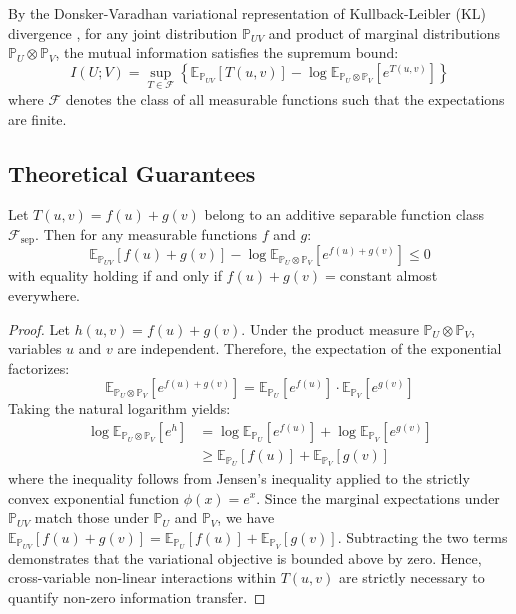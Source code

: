By the Donsker-Varadhan variational representation of Kullback-Leibler (KL) divergence \cite{donsker1975asymptotic, belghazi2018mine}, for any joint distribution $\mathbb{P}_{UV}$ and product of marginal distributions $\mathbb{P}_U \otimes \mathbb{P}_V$, the mutual information satisfies the supremum bound:
\begin{equation}
\label{eq:dv_supremum}
I(U; V) = \sup_{T \in \mathcal{F}} \left\{ \mathbb{E}_{\mathbb{P}_{UV}}[T(u, v)] - \log \mathbb{E}_{\mathbb{P}_U \otimes \mathbb{P}_V}[e^{T(u, v)}] \right\}
\end{equation}
where $\mathcal{F}$ denotes the class of all measurable functions such that the expectations are finite.

\subsection{Theoretical Guarantees}

\begin{proposition}
\label{prop:non_separable}
Let $T(u, v) = f(u) + g(v)$ belong to an additive separable function class $\mathcal{F}_{\text{sep}}$. Then for any measurable functions $f$ and $g$:
\begin{equation}
\mathbb{E}_{\mathbb{P}_{UV}}[f(u) + g(v)] - \log \mathbb{E}_{\mathbb{P}_U \otimes \mathbb{P}_V}[e^{f(u) + g(v)}] \le 0
\end{equation}
with equality holding if and only if $f(u) + g(v) = \text{constant}$ almost everywhere.
\end{proposition}
\begin{proof}
Let $h(u, v) = f(u) + g(v)$. Under the product measure $\mathbb{P}_U \otimes \mathbb{P}_V$, variables $u$ and $v$ are independent. Therefore, the expectation of the exponential factorizes:
\begin{equation}
\mathbb{E}_{\mathbb{P}_U \otimes \mathbb{P}_V}[e^{f(u)+g(v)}] = \mathbb{E}_{\mathbb{P}_U}[e^{f(u)}] \cdot \mathbb{E}_{\mathbb{P}_V}[e^{g(v)}]
\end{equation}
Taking the natural logarithm yields:
\begin{align}
\log \mathbb{E}_{\mathbb{P}_U \otimes \mathbb{P}_V}[e^{h}] &= \log \mathbb{E}_{\mathbb{P}_U}[e^{f(u)}] + \log \mathbb{E}_{\mathbb{P}_V}[e^{g(v)}] \nonumber \\
&\ge \mathbb{E}_{\mathbb{P}_U}[f(u)] + \mathbb{E}_{\mathbb{P}_V}[g(v)]
\end{align}
where the inequality follows from Jensen's inequality applied to the strictly convex exponential function $\phi(x) = e^x$. Since the marginal expectations under $\mathbb{P}_{UV}$ match those under $\mathbb{P}_U$ and $\mathbb{P}_V$, we have $\mathbb{E}_{\mathbb{P}_{UV}}[f(u) + g(v)] = \mathbb{E}_{\mathbb{P}_U}[f(u)] + \mathbb{E}_{\mathbb{P}_V}[g(v)]$. Subtracting the two terms demonstrates that the variational objective is bounded above by zero. Hence, cross-variable non-linear interactions within $T(u, v)$ are strictly necessary to quantify non-zero information transfer.
\end{proof}

